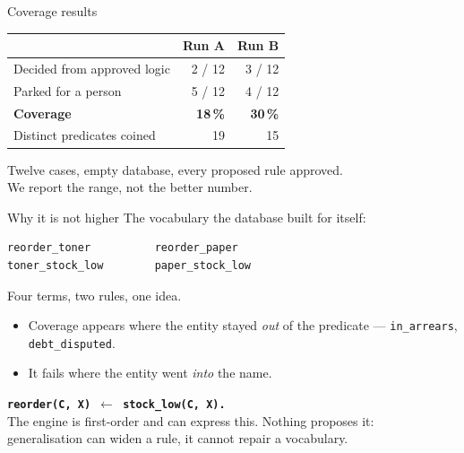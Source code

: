 \documentclass[aspectratio=169,11pt]{beamer}
\begin{document}
\begin{frame}{Coverage results}
  \vspace{.7em}
  \begin{center}
  \begin{tabular}{lrr}
    \toprule
    & \textbf{Run A} & \textbf{Run B} \\
    \midrule
    Decided from approved logic & 2 / 12 & 3 / 12 \\
    Parked for a person         & 5 / 12 & 4 / 12 \\
    \textbf{Coverage}           & \textbf{18\,\%} & \textbf{30\,\%} \\
    Distinct predicates coined  & 19 & 15 \\
    \bottomrule
  \end{tabular}
  \end{center}
  \vspace{1em}
  \pause
  \begin{center}\color{muted}
    Twelve cases, empty database, every proposed rule approved.\\
    We report the range, not the better number.
  \end{center}
\end{frame}

\begin{frame}[fragile]{Why it is not higher}
  \vspace{.6em}
  The vocabulary the database built for itself:
\begin{lstlisting}
reorder_toner          reorder_paper
toner_stock_low        paper_stock_low
\end{lstlisting}
  \vspace{.6em}
  \begin{center}Four terms, two rules, one idea.\end{center}
  \vspace{.9em}
  \pause
  \begin{itemize}\setlength\itemsep{.4em}
    \item Coverage appears where the entity stayed \emph{out} of the predicate
      --- \texttt{in\_arrears}, \texttt{debt\_disputed}.
    \item It fails where the entity went \emph{into} the name.
  \end{itemize}
  \vspace{.8em}
  \begin{center}\color{petrol}\textbf{
    \texttt{reorder(C, X) $\leftarrow$ stock\_low(C, X).}}\\[.3em]
  {\color{muted}\small The engine is first-order and can express this. Nothing
  proposes it:\\ generalisation can widen a rule, it cannot repair a vocabulary.}
  \end{center}
\end{frame}
\end{document}
